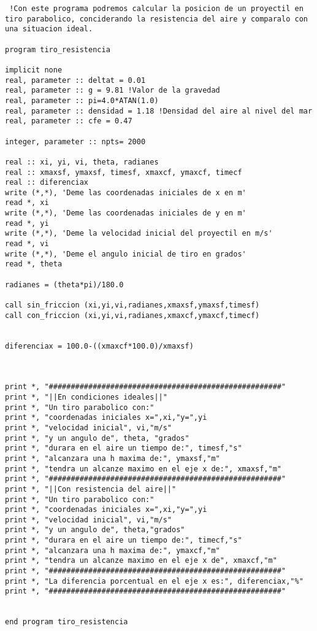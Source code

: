 \documentclass[10pt]{article}
\begin{document}
\begin{verbatim}  
 !Con este programa podremos calcular la posicion de un proyectil en tiro parabolico, conciderando la resistencia del aire y comparalo con una situacion ideal.

program tiro_resistencia

implicit none
real, parameter :: deltat = 0.01
real, parameter :: g = 9.81 !Valor de la gravedad
real, parameter :: pi=4.0*ATAN(1.0)
real, parameter :: densidad = 1.18 !Densidad del aire al nivel del mar
real, parameter :: cfe = 0.47

integer, parameter :: npts= 2000 

real :: xi, yi, vi, theta, radianes
real :: xmaxsf, ymaxsf, timesf, xmaxcf, ymaxcf, timecf
real :: diferenciax
write (*,*), 'Deme las coordenadas iniciales de x en m'
read *, xi
write (*,*), 'Deme las coordenadas iniciales de y en m'
read *, yi
write (*,*), 'Deme la velocidad inicial del proyectil en m/s'
read *, vi
write (*,*), 'Deme el angulo inicial de tiro en grados'
read *, theta

radianes = (theta*pi)/180.0

call sin_friccion (xi,yi,vi,radianes,xmaxsf,ymaxsf,timesf)
call con_friccion (xi,yi,vi,radianes,xmaxcf,ymaxcf,timecf)


diferenciax = 100.0-((xmaxcf*100.0)/xmaxsf)



print *, "#####################################################"
print *, "||En condiciones ideales||"
print *, "Un tiro parabolico con:"
print *, "coordenadas iniciales x=",xi,"y=",yi
print *, "velocidad inicial", vi,"m/s"
print *, "y un angulo de", theta, "grados"
print *, "durara en el aire un tiempo de:", timesf,"s"
print *, "alcanzara una h maxima de:", ymaxsf,"m"
print *, "tendra un alcanze maximo en el eje x de:", xmaxsf,"m"
print *, "#####################################################"
print *, "||Con resistencia del aire||"
print *, "Un tiro parabolico con:"
print *, "coordenadas iniciales x=",xi,"y=",yi
print *, "velocidad inicial", vi,"m/s"
print *, "y un angulo de", theta,"grados"
print *, "durara en el aire un tiempo de:", timecf,"s"
print *, "alcanzara una h maxima de:", ymaxcf,"m"
print *, "tendra un alcanze maximo en el eje x de", xmaxcf,"m"
print *, "#####################################################"
print *, "La diferencia porcentual en el eje x es:", diferenciax,"%"
print *, "#####################################################"


end program tiro_resistencia



\end{verbatim}
\end{document}
